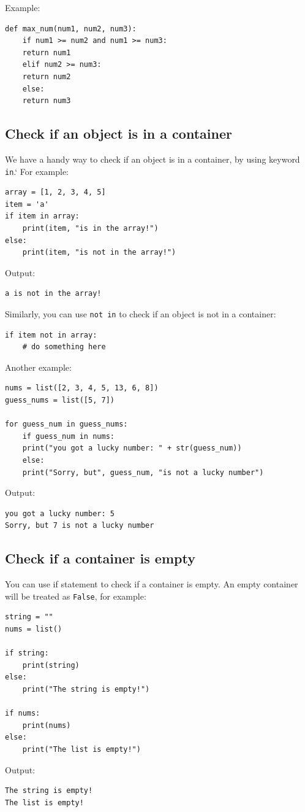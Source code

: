 \documentclass[12pt]{book}
\begin{document}
Example:
\begin{verbatim}
def max_num(num1, num2, num3):
    if num1 >= num2 and num1 >= num3:
	return num1
    elif num2 >= num3:
	return num2
    else:
	return num3
\end{verbatim}
\subsection{Check if an object is in a container}
\label{sec:orgbd9a51c}
We have a handy way to check if an object is in a container, by using keyword \texttt{in}.` For example:
\begin{verbatim}
array = [1, 2, 3, 4, 5]
item = 'a'
if item in array:
    print(item, "is in the array!")
else:
    print(item, "is not in the array!")
\end{verbatim}
Output:
\begin{verbatim}
a is not in the array!
\end{verbatim}

Similarly, you can use \texttt{not in} to check if an object is not in a container:
\begin{verbatim}
if item not in array:
    # do something here
\end{verbatim}

Another example:
\begin{verbatim}
nums = list([2, 3, 4, 5, 13, 6, 8])
guess_nums = list([5, 7])

for guess_num in guess_nums:
    if guess_num in nums:
	print("you got a lucky number: " + str(guess_num))
    else:
	print("Sorry, but", guess_num, "is not a lucky number")
\end{verbatim}
Output:
\begin{verbatim}
you got a lucky number: 5
Sorry, but 7 is not a lucky number
\end{verbatim}

\subsection{Check if a container is empty}
\label{sec:orgbee97fc}
You can use if statement to check if a container is empty. An empty container will be treated as \texttt{False}, for example:
\begin{verbatim}
string = ""
nums = list()

if string:
    print(string)
else:
    print("The string is empty!")

if nums:
    print(nums)
else:
    print("The list is empty!")
\end{verbatim}
Output:
\begin{verbatim}
The string is empty!
The list is empty!
\end{verbatim}
\end{document}
